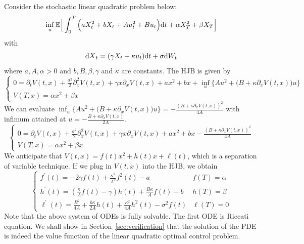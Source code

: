 \documentclass[11pt]{book}
\newcommand{\dt}{\text{\normalfont d}t}
\newcommand{\dX}{\text{\normalfont d}X}
\newcommand{\dW}{\text{\normalfont d}W}
\begin{document}
\begin{eg}\label{eg:LQ_drift}
    Consider the stochastic linear quadratic problem below:
    \begin{equation}
        \inf_u\mathbb{E}\Big[\int_0^T \Big(aX_t^2+bX_t +Au_t^2 + Bu_t\Big){\dt}+\alpha X_T^2+\beta X_T\Big]
    \end{equation}
    with
    \begin{equation}
        {\dX}_t=(\gamma X_t+\kappa u_t){{\dt}}+\sigma \dW_t
    \end{equation}
where $a,A, \alpha>0$ and $b,B,\beta,\gamma$ and $\kappa$ are constants. The HJB is given by 
\begin{equation}
    \begin{cases}
        0=\partial_t V(t,x) +\frac{\sigma^2}{2}\partial^2_x V(t,x)+ \gamma x\partial_x V(t,x) + a x^2 + bx +\inf_{u}\Big\{Au^2 +\big(B+\kappa\partial_x V(t,x)\big)u \Big\}\\
        V(T,x)=\alpha x^2 + \beta x
    \end{cases}
\end{equation}
We can evaluate
$\inf_u\{Au^2 +\big(B+\kappa\partial_x V(t,x)\big)u\} = -\frac{(B+\kappa\partial_x V(t,x))^2}{4A}$ with infimum attained at $u =-\frac{B+\kappa\partial_x V(t,x)}{2A}$.
\begin{equation}
    \begin{cases}
        0=\partial_t V(t,x) +\frac{\sigma^2}{2}\partial^2_x V(t,x)+ \gamma x\partial_x V(t,x) + a x^2 + bx -\frac{(B+\kappa\partial_x V(t,x))^2}{4A}\\
        V(T,x)=\alpha x^2 + \beta x
    \end{cases}
\end{equation}
We anticipate that $V(t,x)=f(t)x^2+h(t)x+\ell(t)$, which is a separation of variable technique. If we plug in $V(t,x)$  into the HJB, we obtain
\begin{equation}
    \begin{cases}
       f^\prime(t) = -2\gamma f(t) + \frac{\kappa^2}{A^2}f^{2}(t) -a& f(T)=\alpha\\
       h^{\prime}(t)= (\frac{\kappa}{A}f(t)-\gamma)h(t)+\frac{B\kappa}{A}f(t)-b& h(T)=\beta\\
       \ell^{\prime}(t)=\frac{B^2}{4A}+\frac{b\kappa}{2A}h(t)+\frac{\kappa^2}{4A}h^2(t)-\sigma^2f(t)&\ell(T)=0
    \end{cases}
\end{equation}
Note that the above system of ODEs is fully solvable. The first ODE is Riccati equation.
We shall show in Section~\ref{sec:verification} that the solution of the PDE is indeed the value function of the linear quadratic optimal control problem.
\end{eg}
\end{document}
